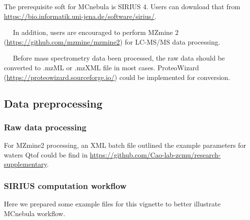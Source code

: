 \documentclass[]{tufte-handout}
\begin{document}
The prerequisite soft for MCnebula is SIRIUS 4. Users can download that
from \url{https://bio.informatik.uni-jena.de/software/sirius/}.

   In addition, users are encouraged to perform MZmine 2
(\url{https://github.com/mzmine/mzmine2}) for LC-MS/MS data processing.

   Before mass spectrometry data been processed, the raw data should be
converted to .mzML or .mzXML file in most cases. ProteoWizard
(\url{https://proteowizard.sourceforge.io/}) could be implemented for
conversion.

\hypertarget{data-preprocessing}{%
\subsection{Data preprocessing}\label{data-preprocessing}}

\hypertarget{raw-data-processing}{%
\subsubsection{Raw data processing}\label{raw-data-processing}}

For MZmine2 processing, an XML batch file outlined the example
parameters for waters Qtof could be find in
\url{https://github.com/Cao-lab-zcmu/research-supplementary}.

\hypertarget{sirius-computation-workflow}{%
\subsubsection{SIRIUS computation
workflow}\label{sirius-computation-workflow}}

Here we prepared some example files for this vignette to better
illustrate MCnebula workflow.
\end{document}
